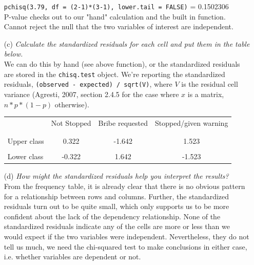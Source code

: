 \documentclass[12pt,letterpaper]{article}
\begin{document}
\begin{enumerate}
	\texttt{pchisq(3.79, df = (2-1)*(3-1), lower.tail = FALSE)} = 0.1502306\\

	P-value checks out to our "hand" calculation and the built in function. Cannot reject the null that the two variables of interest are independent.\\
	
			\vspace{.25cm}
	\item [(c)] \textit{Calculate the standardized residuals for each cell and put them in the table below.}\\
	
			\vspace{.15cm}
	We can do this by hand (see above function), or the standardized residuals are stored in the \texttt{chisq.test} object. We're reporting the standardized residuals, \texttt{(observed - expected) / sqrt(V)}, where $V$ is the residual cell variance (Agresti, 2007, section 2.4.5 for the case where $x$ is a matrix, $n * p * (1 - p)$ otherwise).\\

	  
	
	
	\vspace{.25cm}
	\begin{table}[h!]
		\centering
		\begin{adjustbox}{max width=.75\textwidth}
			\begin{tabular}{l | c c c }
				& Not Stopped & Bribe requested & Stopped/given warning \\
				\\[-1.8ex] 
				\hline \\[-1.8ex]
				Upper class  & 0.322 & -1.642 & 1.523 \\
				\\
				Lower class & -0.322 & 1.642  & -1.523  \\
				
			\end{tabular}
		\end{adjustbox}
	\end{table}
	
		\vspace{.5cm}
	\item [(d)] \textit{How might the standardized residuals help you interpret the results?}  \\
	
			\vspace{.15cm}
	From the frequency table, it is already clear that there is no obvious pattern for a relationship between rows and columns. Further, the standardized residuals turn out to be quite small, which only supports us to be more confident about the lack of the dependency relationship. None of the standardized residuals indicate any of the cells are more or less than we would expect if the two variables were independent. Nevertheless, they do not tell us much, we need the chi-squared test to make conclusions in either case, i.e. whether variables are dependent or not.
	
\end{enumerate}
\end{document}
